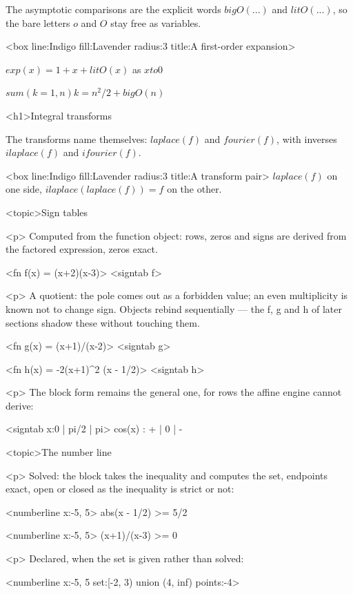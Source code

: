 \documentclass[
  margins=8,
  font=Latin Modern Roman,
  size=12,
  linespread=1.4,
  lang=en,
  precision=4
]{scholatex}
\begin{document}
The asymptotic comparisons are the explicit words $bigO(...)$ and
$litO(...)$, so the bare letters $o$ and $O$ stay free as variables.

<box line:Indigo fill:Lavender radius:3 title:{A first-order expansion}>{
	$exp(x) = 1 + x + litO(x)$ as $x to 0$

	$sum(k=1, n) k = n^2/2 + bigO(n)$
}

<h1>Integral transforms

The transforms name themselves: $laplace(f)$ and $fourier(f)$, with inverses
$ilaplace(f)$ and $ifourier(f)$.

<box line:Indigo fill:Lavender radius:3 title:{A transform pair}>{
	$laplace(f)$ on one side, $ilaplace(laplace(f)) = f$ on the other.
}

<topic>Sign tables

<p>{ Computed from the function object: rows, zeros and signs are derived
from the factored expression, zeros exact. }

<fn f(x) = (x+2)(x-3)>
<signtab f>

<p>{ A quotient: the pole comes out as a forbidden value; an even
multiplicity is known not to change sign. Objects rebind sequentially ---
the f, g and h of later sections shadow these without touching them. }

<fn g(x) = (x+1)/(x-2)>
<signtab g>

<fn h(x) = -2(x+1)^2 (x - 1/2)>
<signtab h>

<p>{ The block form remains the general one, for rows the affine engine
cannot derive: }

<signtab x:{0 | pi/2 | pi}>{
	cos(x) : + | 0 | -
}

<topic>The number line

<p>{ Solved: the block takes the inequality and computes the set, endpoints
exact, open or closed as the inequality is strict or not: }

<numberline x:{-5, 5}>{
	abs(x - 1/2) >= 5/2
}

<numberline x:{-5, 5}>{
	(x+1)/(x-3) >= 0
}

<p>{ Declared, when the set is given rather than solved: }

<numberline x:{-5, 5} set:{[-2, 3) union (4, inf)} points:{-4}>
\end{document}
